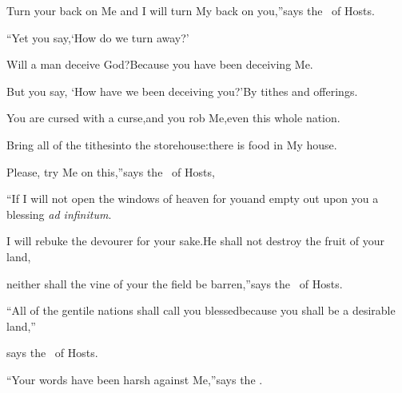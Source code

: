 \begin{inparaenum}
  \pb{}Turn your back on Me and I will turn My back on you,''\pa{}says the \lord\ of Hosts.%

  \pb{}``Yet you say,\pa{}`How do we turn away?'%

  \pa{} Will a man deceive%
  God?\pa{}Because you have been deceiving Me.%

  \pb{}But you say, `How have we been deceiving you?'\pa{}By tithes and offerings.%

  \pa{} You are cursed with a curse,\pa{}and you rob Me,\pa{}even this whole nation.%

  \pa{} Bring all of the tithes\pa{}into the storehouse:\pa{}there is food in My house.%

  \pb{}Please, try Me on this,''\pa{}says the \lord\ of Hosts,%

  \pb{}``If I will not open the windows of heaven for you\pa{}and empty out upon you a blessing \textit{ad infinitum}.%

  \pa{} I will rebuke the devourer for your sake.\pa{}He shall not destroy the fruit of your land,%

  \pb{}neither shall the vine of your the field be barren,''\pa{}says the \lord\ of Hosts.%

  \pa{} ``All of the gentile nations shall call you blessed\pa{}because you shall be a desirable land,''%

  \pa{}says the \lord\ of Hosts.%

  \pa{} ``Your words have been harsh against Me,''\pa{}says the \lord.%


\end{inparaenum}
